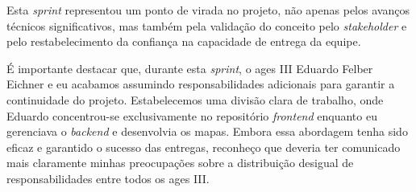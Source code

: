 Esta \textit{sprint} representou um ponto de virada no projeto, não apenas pelos avanços técnicos significativos, mas também pela validação do conceito pelo \textit{stakeholder} e pelo restabelecimento da confiança na capacidade de entrega da equipe.

É importante destacar que, durante esta \textit{sprint}, o \ac{ages} III Eduardo Felber Eichner e eu acabamos assumindo responsabilidades adicionais para garantir a continuidade do projeto. Estabelecemos uma divisão clara de trabalho, onde Eduardo concentrou-se exclusivamente no repositório \textit{frontend} enquanto eu gerenciava o \textit{backend} e desenvolvia os mapas. Embora essa abordagem tenha sido eficaz e garantido o sucesso das entregas, reconheço que deveria ter comunicado mais claramente minhas preocupações sobre a distribuição desigual de responsabilidades entre todos os \ac{ages} III.
